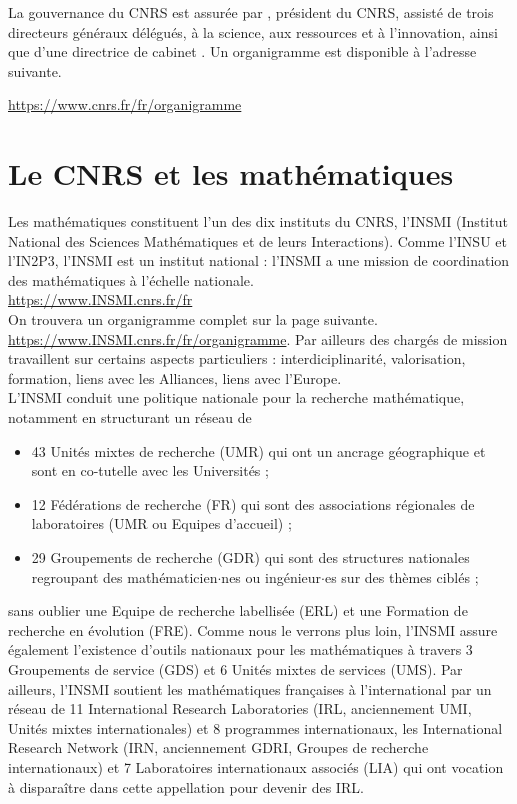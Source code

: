 La gouvernance du CNRS est assur\'ee par , pr\'esident du CNRS, assist\'e de trois
directeurs g\'en\'eraux d\'el\'egu\'es,  \`a la science,  aux
 ressources et  \`a l'innovation, ainsi que d'une directrice de cabinet . Un organigramme est disponible \`a l'adresse suivante.
 
\url{https://www.cnrs.fr/fr/organigramme}



\section{Le CNRS et les math\'ematiques}\label{sec:INSMI}

Les math\'ematiques
constituent l'un des dix instituts du CNRS, l'INSMI
(Institut National des Sciences Math\'ematiques et de
leurs Interactions). Comme l'INSU et l'IN2P3, l'INSMI est un institut national : l'INSMI a une mission de coordination des math\'ematiques \`a l'\'echelle nationale.\\
 \url{https://www.INSMI.cnrs.fr/fr}\\
On trouvera un organigramme complet sur la page suivante.\\
\url{https://www.INSMI.cnrs.fr/fr/organigramme}.
Par ailleurs des charg\'es de mission travaillent sur certains aspects particuliers : interdiciplinarit\'e, valorisation, formation, liens avec les Alliances, liens avec l'Europe. 
\\

L'INSMI conduit une politique nationale pour la recherche math\'ematique, notamment en structurant un r\'eseau de
\begin{itemize}
\item 43 Unit\'es mixtes de recherche (UMR) qui ont un ancrage g\'eographique et sont  en co-tutelle avec les Universit\'es ;
\item 12 F\'ed\'erations de recherche (FR) qui sont des associations r\'egionales de laboratoires (UMR ou Equipes d'accueil) ;
\item 29 Groupements de recherche (GDR) qui sont des structures nationales regroupant des math\'ematicien$\cdot$nes ou ing\'enieur$\cdot$es sur des th\`emes cibl\'es ;
\end{itemize}
sans oublier une Equipe de recherche labellis\'ee (ERL) et une Formation de recherche en \'evolution (FRE). Comme nous le verrons plus loin, l'INSMI assure \'egalement l'existence d'outils nationaux pour les math\'ematiques \`a travers 3 Groupements de service (GDS) et 6 Unit\'es mixtes de services (UMS). Par ailleurs, l'INSMI soutient les math\'ematiques fran\c{c}aises \`a l'international par un r\'eseau de 11 International Research Laboratories (IRL, anciennement UMI, Unit\'es mixtes internationales) et 8 programmes internationaux, les International Research Network (IRN, anciennement GDRI, Groupes de recherche internationaux) et 7 Laboratoires internationaux associ\'es (LIA) qui ont vocation \`a dispara\^itre dans cette appellation pour devenir des IRL.\\

